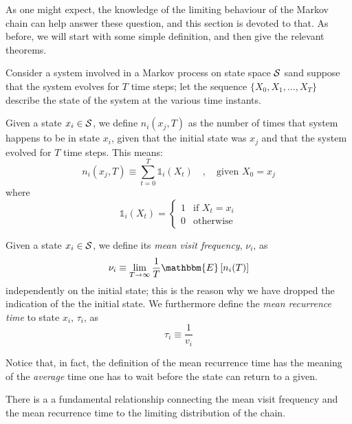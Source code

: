 As one might expect, the knowledge of the limiting behaviour of the Markov chain can help answer these question, and this section is devoted to that. As before, we will start with some simple definition, and then give the relevant theorems.

\medskip
Consider a system involved in a Markov process on state space $\mathcal{S}$ sand suppose that the system evolves for $T$ time steps; let the sequence $\{X_0, X_1, \dots, X_T\}$ describe the state of the system at the various time instants.
\begin{ndef} 
    Given a state $x_i \in \mathcal{S}$, we define $n_i (x_j, T)$ as the number of times that system happens to be in state $x_i$, given that the initial state was $x_j$ and that the system evolved for $T$ time steps. This means:
    \begin{equation}
        n_i (x_j, T) \equiv \sum_{t = 0}^T \mathbb{1}_i(X_t) \quad , \quad \text{given }X_0 = x_j
    \end{equation} 
    where 
    \begin{equation}
        \mathbb{1}_i(X_t) = 
        \begin{cases}
            1 & \text{if $X_t = x_i$} \\
            0 & \text{otherwise}
        \end{cases}
    \end{equation}
\end{ndef}
\begin{ndef} 
    Given a state $x_i \in \mathcal{S}$, we define its \emph{mean visit frequency}, $\nu_i$, as 
    \begin{equation}
        \nu_i \equiv \lim_{T\rightarrow \infty} \frac{1}{T} \mathbbm{E} \left[ n_i (T) \right]
    \end{equation}
    independently on the initial state; this is the reason why we have dropped the indication of the the initial state.
    We furthermore define the \emph{mean recurrence time} to state $x_i$, $\tau_i$, as 
    \begin{equation}
        \tau_i \equiv \frac{1}{v_i}
    \end{equation}
\end{ndef}
Notice that, in fact, the definition of the mean recurrence time has the meaning of the \emph{average} time one has to wait before the state can return to a given.

\medskip
There is a a fundamental relationship connecting the mean visit frequency and the mean recurrence time to the limiting distribution of the chain.

